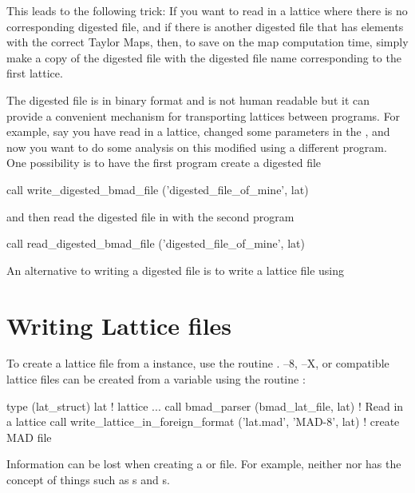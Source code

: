 This leads to the following trick: If you want to read in a lattice
where there is no corresponding digested file, and if there is another
digested file that has elements with the correct Taylor Maps, then, to
save on the map computation time, simply make a copy of the digested
file with the digested file name corresponding to the first lattice.

The digested file is in binary format and is not human readable but it
can provide a convenient mechanism for transporting lattices between
programs. For example, say you have read in a lattice, changed
some parameters in the , and now you want to do some
analysis on this modified  using a different program. 
One possibility is to have the first program create a digested file
\begin{example}
  call write_digested_bmad_file ('digested_file_of_mine', lat)
\end{example}
and then read the digested file in with the second program
\begin{example}
  call read_digested_bmad_file ('digested_file_of_mine', lat)
\end{example}
An alternative to writing a digested file is to write a lattice file
using 

\section{Writing Lattice files}
\label{s:lat.write}

To create a \bmad lattice file from a  instance, use the routine
.
\mad--8, \mad--X, or  compatible lattice 
files can be created from a  variable 
using the routine 
:
\begin{example}
  type (lat_struct) lat             ! lattice
  ...
  call bmad_parser (bmad_lat_file, lat)               ! Read in a lattice
  call write_lattice_in_foreign_format ('lat.mad', 'MAD-8', lat)  ! create MAD file
\end{example}
Information can be lost when creating a \mad or  file.
For example, neither \mad nor  has the concept of 
things such as s and s.

